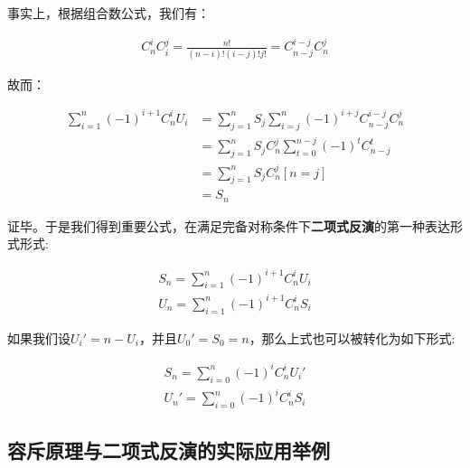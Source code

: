 \documentclass[UTF8]{book}
\begin{document}
事实上，根据组合数公式，我们有：
\begin{large}
    \begin{equation}
        \begin{aligned}
            C_n^iC_i^j=\frac{n!}{(n-i)!(i-j)!j!}=C_{n-j}^{i-j}C_n^j
            \nonumber
        \end{aligned}
    \end{equation}
\end{large}
故而：
\begin{large}
    \begin{equation}
        \begin{aligned}
            \sum_{i=1}^n(-1)^{i+1}C_n^iU_i &= \sum_{j=1}^nS_j\sum_{i=j}^n(-1)^{i+j}C_{n-j}^{i-j}C_n^j \\
            &= \sum_{j=1}^nS_jC_n^j\sum_{t=0}^{n-j}(-1)^tC_{n-j}^{t} \\
            &= \sum_{j=1}^nS_jC_n^j[n=j] \\
            &= S_n
            \nonumber
        \end{aligned}
    \end{equation}
\end{large}
证毕。于是我们得到重要公式，在满足完备对称条件下\textbf{二项式反演}的第一种表达形式形式:
\begin{large}
    \begin{equation}
        \begin{aligned}
            S_n=\sum_{i=1}^n(-1)^{i+1}C_n^iU_i \\
            U_n=\sum_{i=1}^n(-1)^{i+1}C_n^iS_i
            \nonumber
        \end{aligned}
    \end{equation}
\end{large}
如果我们设$U_i'=n-U_i$，并且$U_0'=S_0=n$，那么上式也可以被转化为如下形式:
\begin{large}
    \begin{equation}
        \begin{aligned}
            S_n=\sum_{i=0}^n(-1)^{i}C_n^iU_i' \\
            U_n'=\sum_{i=0}^n(-1)^{i}C_n^iS_i
            \nonumber
        \end{aligned}
    \end{equation}
\end{large}

\subsection{容斥原理与二项式反演的实际应用举例}
\end{document}
